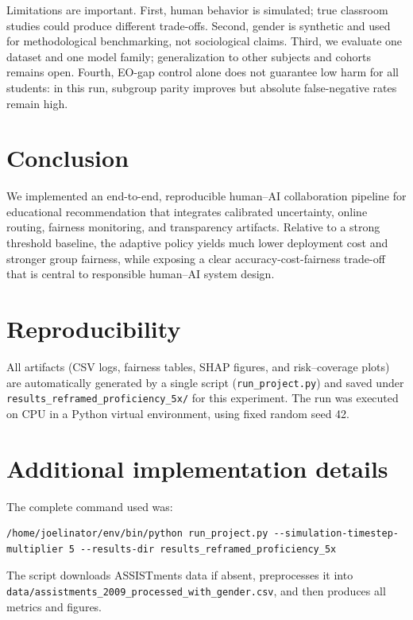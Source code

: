 \documentclass{article}
\begin{document}
Limitations are important. First, human behavior is simulated; true classroom studies could produce different trade-offs. Second, gender is synthetic and used for methodological benchmarking, not sociological claims. Third, we evaluate one dataset and one model family; generalization to other subjects and cohorts remains open. Fourth, EO-gap control alone does not guarantee low harm for all students: in this run, subgroup parity improves but absolute false-negative rates remain high.

\section{Conclusion}
We implemented an end-to-end, reproducible human--AI collaboration pipeline for educational recommendation that integrates calibrated uncertainty, online routing, fairness monitoring, and transparency artifacts. Relative to a strong threshold baseline, the adaptive policy yields much lower deployment cost and stronger group fairness, while exposing a clear accuracy-cost-fairness trade-off that is central to responsible human--AI system design.

\section*{Reproducibility}
All artifacts (CSV logs, fairness tables, SHAP figures, and risk--coverage plots) are automatically generated by a single script (\texttt{run\_project.py}) and saved under \texttt{results\_reframed\_proficiency\_5x/} for this experiment. The run was executed on CPU in a Python virtual environment, using fixed random seed 42.




\appendix
\section{Additional implementation details}
The complete command used was:
\begin{verbatim}
/home/joelinator/env/bin/python run_project.py --simulation-timestep-multiplier 5 --results-dir results_reframed_proficiency_5x
\end{verbatim}
The script downloads ASSISTments data if absent, preprocesses it into
\texttt{data/assistments\_2009\_processed\_with\_gender.csv}, and then produces all metrics and figures.
\end{document}
